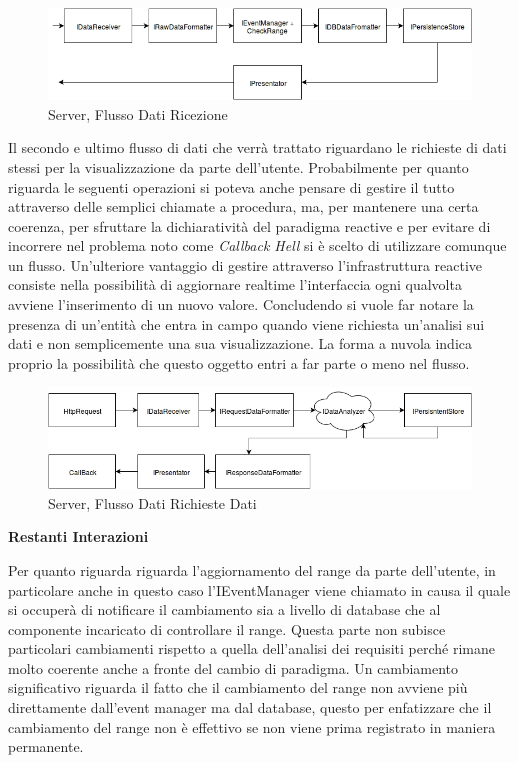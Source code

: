 \begin{figure}[h]
\centering
\includegraphics[width=\textwidth]{Figures/LogicArchitecture/Server/FlowDiagramReceiveData}
\caption{Server, Flusso Dati Ricezione}
\end{figure}

Il secondo e ultimo flusso di dati che verr\`a trattato riguardano le richieste di dati stessi per la visualizzazione da parte dell'utente. Probabilmente per quanto riguarda le seguenti operazioni si poteva anche pensare di gestire il tutto attraverso delle semplici chiamate a procedura, ma, per mantenere una certa coerenza, per sfruttare la dichiarativit\`a del paradigma reactive e per evitare di incorrere nel problema noto come \textit{Callback Hell} si \`e scelto di utilizzare comunque un flusso. Un'ulteriore vantaggio di gestire attraverso l'infrastruttura reactive consiste nella possibilit\`a di aggiornare realtime l'interfaccia ogni qualvolta avviene l'inserimento di un nuovo valore. Concludendo si vuole far notare la presenza di un'entit\`a che entra in campo quando viene richiesta un'analisi sui dati e non semplicemente una sua visualizzazione. La forma a nuvola indica proprio la possibilit\`a che questo oggetto entri a far parte o meno nel flusso.

\begin{figure}[h]
\centering
\includegraphics[width=\textwidth]{Figures/LogicArchitecture/Server/FlowDiagramViewData}
\caption{Server, Flusso Dati Richieste Dati}
\end{figure}

\begin{center}
  \textbf{Restanti Interazioni}
\end{center}

Per quanto riguarda  riguarda l'aggiornamento del range da parte dell'utente, in particolare anche in questo caso l'IEventManager viene chiamato in causa il quale si occuper\`a di notificare il cambiamento sia a livello di database che al componente incaricato di controllare il range. Questa parte non subisce particolari cambiamenti rispetto a quella dell'analisi dei requisiti perch\'e rimane molto coerente anche a fronte del cambio di paradigma. Un cambiamento significativo riguarda il fatto che il cambiamento del range non avviene pi\`u direttamente dall'event manager ma dal database, questo per enfatizzare che il cambiamento del range non \`e effettivo se non viene prima registrato in maniera permanente.

